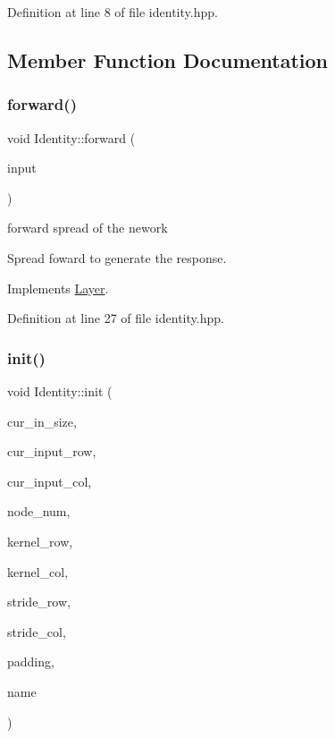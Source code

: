Definition at line 8 of file identity.\+hpp.



\subsection{Member Function Documentation}
\mbox{\label{class_identity_af202a7a325b2db8939e00673877c6b2e}} 
\subsubsection{\texorpdfstring{forward()}{forward()}}
{\footnotesize\ttfamily void Identity\+::forward (\begin{DoxyParamCaption}\item[{std\+::vector$<$ Eigen\+::\+Matrix\+Xd $>$}]{input }\end{DoxyParamCaption})\hspace{0.3cm}{\ttfamily [virtual]}}



forward spread of the nework 

Spread foward to generate the response. 

Implements \hyperlink{class_layer_ac0b116d692ea457f8e7c0f79f7159004}{Layer}.



Definition at line 27 of file identity.\+hpp.

\mbox{\label{class_identity_adcf6d70548e5f5d63d1919c79fb1bcce}} 
\subsubsection{\texorpdfstring{init()}{init()}}
{\footnotesize\ttfamily void Identity\+::init (\begin{DoxyParamCaption}\item[{int}]{cur\+\_\+in\+\_\+size,  }\item[{int}]{cur\+\_\+input\+\_\+row,  }\item[{int}]{cur\+\_\+input\+\_\+col,  }\item[{double}]{node\+\_\+num,  }\item[{double}]{kernel\+\_\+row,  }\item[{double}]{kernel\+\_\+col,  }\item[{double}]{stride\+\_\+row,  }\item[{double}]{stride\+\_\+col,  }\item[{std\+::string}]{padding,  }\item[{std\+::string}]{name }\end{DoxyParamCaption})\hspace{0.3cm}{\ttfamily [virtual]}}



